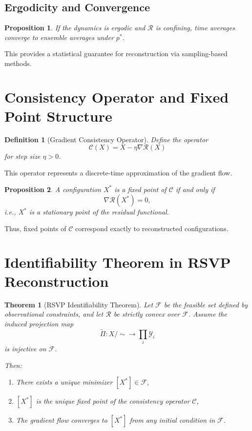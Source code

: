 \documentclass[12pt]{article}
\newtheorem{definition}{Definition}
\newtheorem{theorem}{Theorem}
\newtheorem{proposition}{Proposition}
\begin{document}
\subsection{Ergodicity and Convergence}

\begin{proposition}
If the dynamics is ergodic and $\mathcal{R}$ is confining, time averages converge to ensemble averages under $p^*$.
\end{proposition}

This provides a statistical guarantee for reconstruction via sampling-based methods.

\section{Consistency Operator and Fixed Point Structure}

\begin{definition}[Gradient Consistency Operator]
Define the operator
\[
\mathcal{C}(X) = X - \eta \nabla \mathcal{R}(X)
\]
for step size $\eta > 0$.
\end{definition}

This operator represents a discrete-time approximation of the gradient flow.

\begin{proposition}
A configuration $X^*$ is a fixed point of $\mathcal{C}$ if and only if
\[
\nabla \mathcal{R}(X^*) = 0,
\]
i.e., $X^*$ is a stationary point of the residual functional.
\end{proposition}

Thus, fixed points of $\mathcal{C}$ correspond exactly to reconstructed configurations.

\section{Identifiability Theorem in RSVP Reconstruction}

\begin{theorem}[RSVP Identifiability Theorem]
Let $\mathcal{F}$ be the feasible set defined by observational constraints, and let $\mathcal{R}$ be strictly convex over $\mathcal{F}$. Assume the induced projection map
\[
\tilde{\Pi} : X/{\sim} \to \prod_i \mathcal{Y}_i
\]
is injective on $\mathcal{F}$.

Then:
\begin{enumerate}
\item There exists a unique minimizer $[X^*] \in \mathcal{F}$,
\item $[X^*]$ is the unique fixed point of the consistency operator $\mathcal{C}$,
\item The gradient flow converges to $[X^*]$ from any initial condition in $\mathcal{F}$.
\end{enumerate}
\end{theorem}
\end{document}
